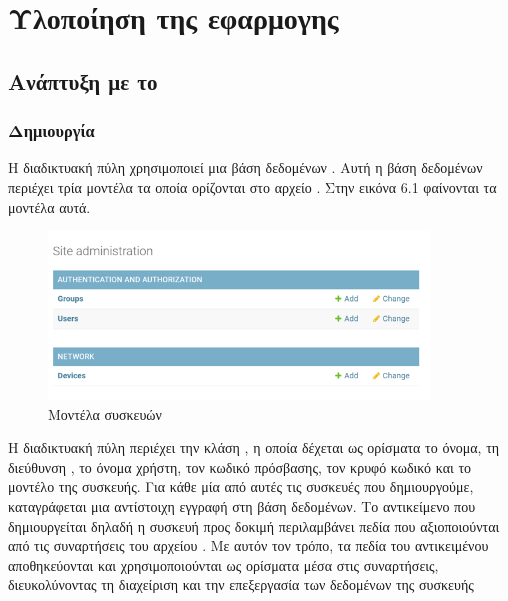 \chapter{Υλοποίηση της εφαρμογης}

\section{Ανάπτυξη με το  }

\subsection{Δημιουργία }

Η διαδικτυακή πύλη χρησιμοποιεί μια βάση δεδομένων . Αυτή η βάση δεδομένων περιέχει τρία
μοντέλα τα οποία ορίζονται στο αρχείο . Στην εικόνα 6.1 φαίνονται τα μοντέλα αυτά.

\FloatBarrier

\begin{figure}[htb]
	\centering
	\includegraphics[width=0.9\textwidth]{graphics/models_2.png}
	\caption{Μοντέλα συσκευών}
\end{figure}

\FloatBarrier


Η διαδικτυακή πύλη περιέχει την κλάση , η οποία δέχεται ως ορίσματα το όνομα, τη διεύθυνση , το όνομα χρήστη, τον κωδικό πρόσβασης, τον κρυφό κωδικό και το μοντέλο της συσκευής. Για κάθε μία από αυτές τις συσκευές που δημιουργούμε, καταγράφεται μια αντίστοιχη εγγραφή στη βάση δεδομένων. Το αντικείμενο που δημιουργείται δηλαδή η συσκευή προς δοκιμή περιλαμβάνει πεδία που αξιοποιούνται από τις συναρτήσεις του αρχείου . Με αυτόν τον τρόπο, τα πεδία του αντικειμένου αποθηκεύονται και χρησιμοποιούνται ως ορίσματα μέσα στις συναρτήσεις, διευκολύνοντας τη διαχείριση και την επεξεργασία των δεδομένων της συσκευής




